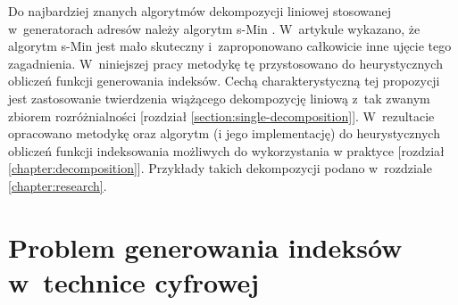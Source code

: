 Do najbardziej znanych algorytmów dekompozycji liniowej stosowanej w~generatorach adresów należy algorytm s-Min \cite{sasao-recent, sasao-s-min}.
W~artykule \cite{redukcja-kompresja} wykazano, że algorytm s-Min jest mało skuteczny i~zaproponowano całkowicie inne ujęcie tego zagadnienia.
W~niniejszej pracy metodykę tę przystosowano do heurystycznych obliczeń funkcji generowania indeksów.
Cechą charakterystyczną tej propozycji jest zastosowanie twierdzenia wiążącego dekompozycję liniową
z~tak zwanym zbiorem rozróżnialności [rozdział \ref{section:single-decomposition}].
W~rezultacie opracowano metodykę oraz algorytm (i jego implementację) do heurystycznych obliczeń funkcji indeksowania możliwych do wykorzystania w praktyce [rozdział \ref{chapter:decomposition}].
Przykłady takich dekompozycji podano w~rozdziale \ref{chapter:research}.

\section{Problem generowania indeksów w~technice cyfrowej}

